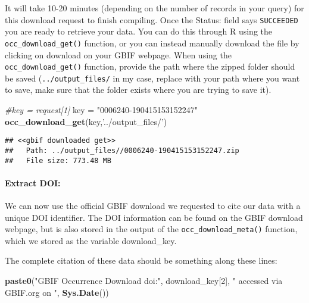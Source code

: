 \documentclass[]{article}
\newenvironment{Shaded}{\begin{snugshade}}{\end{snugshade}}
\newcommand{\CommentTok}[1]{\textcolor[rgb]{0.56,0.35,0.01}{\textit{#1}}}
\newcommand{\DecValTok}[1]{\textcolor[rgb]{0.00,0.00,0.81}{#1}}
\newcommand{\KeywordTok}[1]{\textcolor[rgb]{0.13,0.29,0.53}{\textbf{#1}}}
\newcommand{\NormalTok}[1]{#1}
\newcommand{\StringTok}[1]{\textcolor[rgb]{0.31,0.60,0.02}{#1}}
\let\oldparagraph\paragraph
\renewcommand{\paragraph}[1]{\oldparagraph{#1}\mbox{}}
\begin{document}
It will take 10-20 minutes (depending on the number of records in your
query) for this download request to finish compiling. Once the Status:
field says \texttt{SUCCEEDED} you are ready to retrieve your data. You
can do this through R using the \texttt{occ\_download\_get()} function,
or you can instead manually download the file by clicking on download on
your GBIF webpage. When using the \texttt{occ\_download\_get()}
function, provide the path where the zipped folder should be saved
(\texttt{../output\_files/} in my case, replace with your path where you
want to save, make sure that the folder exists where you are trying to
save it).

\begin{Shaded}
\begin{Highlighting}[]
\CommentTok{#key = request[1]}
\NormalTok{key =}\StringTok{ "0006240-190415153152247"}
\KeywordTok{occ_download_get}\NormalTok{(key,}\StringTok{'../output_files/'}\NormalTok{)}
\end{Highlighting}
\end{Shaded}

\begin{verbatim}
## <<gbif downloaded get>>
##   Path: ../output_files//0006240-190415153152247.zip
##   File size: 773.48 MB
\end{verbatim}

\hypertarget{extract-doi}{%
\paragraph{Extract DOI:}\label{extract-doi}}

We can now use the official GBIF download we requested to cite our data
with a unique DOI identifier. The DOI information can be found on the
GBIF download webpage, but is also stored in the output of the
\texttt{occ\_download\_meta()} function, which we stored as the variable
download\_key.

The complete citation of these data should be something along these
lines:

\begin{Shaded}
\begin{Highlighting}[]
\KeywordTok{paste0}\NormalTok{(}\StringTok{"GBIF Occurrence Download doi:"}\NormalTok{, download_key[}\DecValTok{2}\NormalTok{], }\StringTok{" accessed via GBIF.org on "}\NormalTok{, }\KeywordTok{Sys.Date}\NormalTok{())}
\end{Highlighting}
\end{Shaded}
\end{document}
